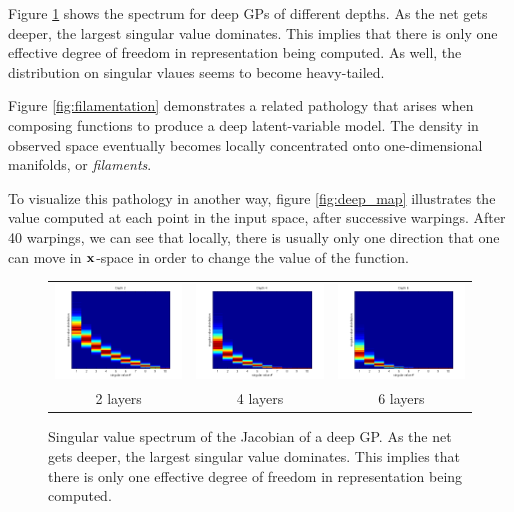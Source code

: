 \documentclass{article}
\begin{document}
Figure \ref{fig:deep_spectrum} shows the spectrum for deep GPs of different depths.  As the net gets deeper, the largest singular value dominates.  This implies that there is only one effective degree of freedom in representation being computed.  As well, the distribution on singular vlaues seems to become heavy-tailed.

Figure \ref{fig:filamentation} demonstrates a related pathology that arises when composing functions to produce a deep latent-variable model.  The density in observed space eventually becomes locally concentrated onto one-dimensional manifolds, or \emph{filaments}.

To visualize this pathology in another way, figure \ref{fig:deep_map} illustrates the value computed at each point in the input space, after successive warpings.  After 40 warpings, we can see that locally, there is usually only one direction that one can move in ${\bf{x}}$-space in order to change the value of the function.

\begin{figure}
\centering
\begin{tabular}{ccc}
\includegraphics[width=0.3\columnwidth]{figures/spectrum/svd_specturm_depth_2} &
\includegraphics[width=0.3\columnwidth]{figures/spectrum/svd_specturm_depth_4} &
\includegraphics[width=0.3\columnwidth]{figures/spectrum/svd_specturm_depth_6} \\
2 layers & 4 layers & 6 layers
\end{tabular}
\caption{Singular value spectrum of the Jacobian of a deep GP.  As the net gets deeper, the largest singular value dominates.  This implies that there is only one effective degree of freedom in representation being computed.}
\label{fig:deep_spectrum}
\end{figure}
\end{document}
